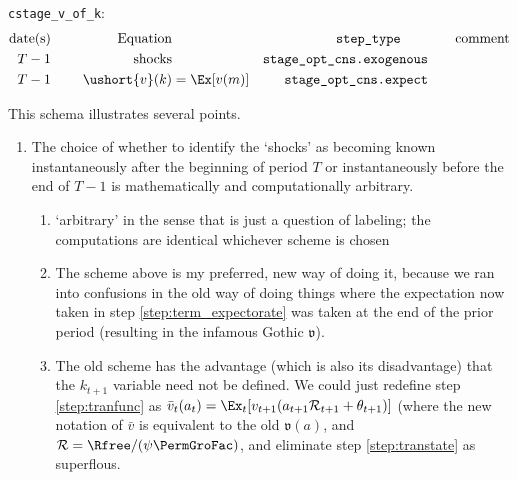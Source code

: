 \documentclass[\econtexRoot/BufferStockTheory]{subfiles}
\newcommand{\EOP}{\bar}
\newcommand{\MOP}{}
\newcommand{\BOP}{\ushort}
\begin{document}
\texttt{cstage\_v\_of\_k}:
\begin{alignat}{3}
\text{date(s)}              &      &   \notag \text{Equation} & \qquad                          & \qquad \texttt{step\_type} \qquad & \qquad \text{comment}
\\ T-1                    & ~~~~ & \text{shocks}    &                                 & \texttt{stage\_opt\_cns.exogenous}          & \label{step:stage_exogenous}
\\ T-1                    & ~~~~ & \BOP{v}(k) & = \Ex[\MOP{v}(m)]                     & \texttt{stage\_opt\_cns.expect}          & \label{step:stage_expectorate}
\end{alignat}


This schema illustrates several points.


\begin{enumerate}
\item The choice of whether to identify the `shocks' as becoming known instantaneously after the beginning of period $T$ or instantaneously before the end of $T-1$ is mathematically and computationally arbitrary.
  \begin{enumerate}
    \item `arbitrary' in the sense that is just a question of labeling; the computations are identical whichever scheme is chosen
  \item The scheme above is my preferred, new way of doing it, because we ran into confusions in the old way of doing things where the expectation now taken in step \ref{step:term_expectorate} was taken at the end of the prior period (resulting in the infamous Gothic $\mathfrak{v}$).  
    \item The old scheme has the advantage (which is also its disadvantage) that the $k_{t+1}$ variable need not be defined.  We could just redefine step \ref{step:tranfunc} as $\EOP{v}_{t}(a_{t}) = \Ex_{t}[\MOP{v}_{t+1}(a_{t+1} \mathcal{R}_{t+1} + \theta_{t+1})]$ (where the new notation of $\EOP{v}$ is equivalent to the old $\mathfrak{v}(a)$, and $\mathcal{R}=\Rfree / (\psi \PermGroFac)$, and eliminate step \ref{step:transtate} as superflous.  

  \end{enumerate}

\pagebreak


\end{enumerate}
\end{document}
